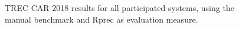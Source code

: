 \documentclass{article}
\begin{document}
\begin{figure}
    \centering
    \hfill
    \caption{TREC CAR 2018 results for all participated systems, using the manual benchmark and Rprec as evaluation measure.}
    \label{fig:trec_2018_results}
\end{figure}
\end{document}
